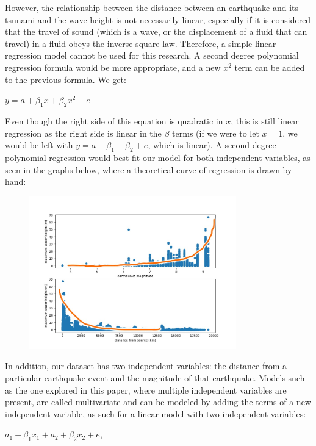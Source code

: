 \documentclass[11pt,letterpaper]{article}
\begin{document}
However, the relationship between the distance between an earthquake and its tsunami and the wave height is not necessarily linear, especially if it is considered that the travel of sound (which is a wave, or the displacement of a fluid that can travel) in a fluid obeys the inverse square law. Therefore, a simple linear regression model cannot be used for this research. A second degree polynomial regression formula would be more appropriate, and a new $x^2$ term can be added to the previous formula. We get:

$y = a + \beta_1 x + \beta_2 x^2 + e$

Even though the right side of this equation is quadratic in $x$, this is still linear regression as the right side is linear in the $\beta$ terms (if we were to let $x = 1$, we would be left with $y = a + \beta_1 + \beta_2 + e$, which is linear). A second degree polynomial regression would best fit our model for both independent variables, as seen in the graphs below, where a theoretical curve of regression is drawn by hand:

\begin{figure}[H]
    \centering
    \includegraphics[width=0.8\textwidth]{modelshowcase.jpeg}
    \label{fig:boat1}
\end{figure}


In addition, our dataset has two independent variables: the distance from a particular earthquake event and the magnitude of that earthquake. Models such as the one explored in this paper, where multiple independent variables are present, are called multivariate and can be modeled by adding the terms of a new independent variable, as such for a linear model with two independent variables:

$a_1 + \beta_1 x_1 + a_2 + \beta_2 x_2 + e$,
\end{document}
